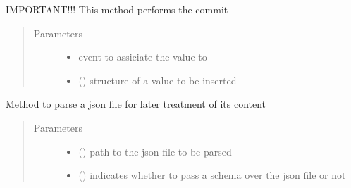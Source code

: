 \begin{fulllineitems}
\begin{fulllineitems}
IMPORTANT!!! This method performs the commit
\begin{quote}\begin{description}
\item[{Parameters}] \leavevmode\begin{itemize}
\item {} 
 \textendash{} event to assiciate the value to

\item {} 
 () \textendash{} structure of a value to be inserted

\end{itemize}

\end{description}\end{quote}

\end{fulllineitems}


\begin{fulllineitems}
\label{\detokenize{eboa.engine:eboa.engine.engine.Engine.parse_data_from_json}}
Method to parse a json file for later treatment of its content
\begin{quote}\begin{description}
\item[{Parameters}] \leavevmode\begin{itemize}
\item {} 
 () \textendash{} path to the json file to be parsed

\item {} 
 () \textendash{} indicates whether to pass a schema over the json file or not

\end{itemize}

\end{description}\end{quote}


\end{fulllineitems}
\end{fulllineitems}
